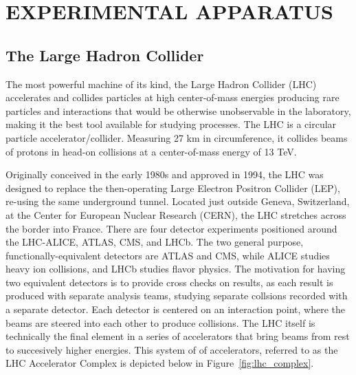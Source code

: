%
%
%
%
%
%
%
%
%
%


%
%

\chapter{EXPERIMENTAL APPARATUS}

\section{The Large Hadron Collider}
The most powerful machine of its kind, the Large Hadron
Collider (LHC) accelerates and collides particles
at high center-of-mass energies producing rare
particles and interactions that would be otherwise unobservable
in the laboratory, making it the best tool available for studying \tth
processes. The LHC is a circular particle accelerator/collider. Measuring 27 km
in circumference, it collides beams of protons in head-on collisions       
at a center-of-mass energy of 13 TeV.

Originally conceived in the early 1980s and approved in 1994, the LHC was designed to replace the then-operating
Large Electron Positron Collider (LEP), re-using the same underground tunnel. Located just outside Geneva, Switzerland, at the Center for European Nuclear Research (CERN),
the LHC stretches across the border into France. There are four detector experiments positioned around the LHC-ALICE, ATLAS, CMS, and LHCb. The two general purpose,
functionally-equivalent detectors are ATLAS and CMS, while ALICE studies heavy ion collisions, and LHCb studies flavor physics. 
The motivation for having two equivalent detectors is to provide cross checks on results, as each result is produced with separate analysis teams, studying separate collsions
recorded with a separate detector. Each detector is centered on an interaction point, where the beams are steered into each other to produce collisions. 
The LHC itself is technically the final element in a series of accelerators
that bring beams from rest to succesively higher energies. This system of
of accelerators, referred to as the LHC Accelerator Complex is depicted below in
Figure~\ref{fig:lhc_complex}.

